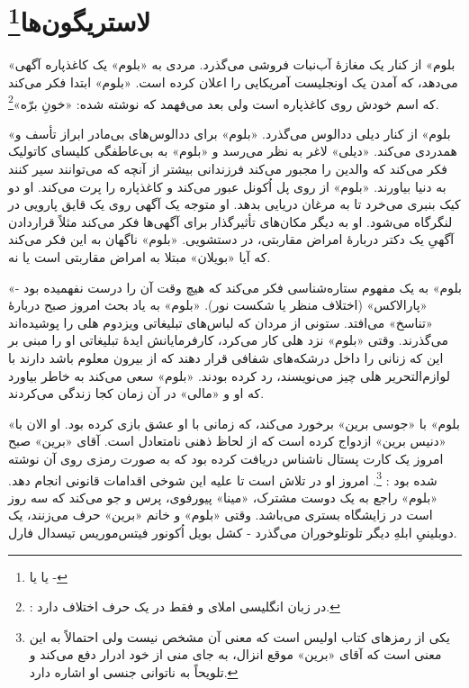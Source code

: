 \documentclass[12pt]{book}
\newcommand{\noun}[1]{«{#1}»}
\begin{document}
    \chapter[لاستریگون‌ها]{لاستریگون‌ها\protect\footnote{ یا  یا -}}\label{ep:8}
    \noun{بلوم} از کنار یک مغازۀ آب‌نبات فروشی می‌گذرد. مردی به \noun{بلوم} یک کاغذپاره آگهی می‌دهد، که آمدن یک اونجلیست آمریکایی را اعلان کرده است. \noun{بلوم} ابتدا فکر می‌کند که اسم خودش روی کاغذپاره است ولی بعد می‌فهمد که نوشته شده: «خونِ برّه»\footnote{: در زبان انگلیسی املای  و  فقط در یک حرف اختلاف دارد.}.

    \noun{بلوم} از کنار دیلی ددالوس می‌گذرد. \noun{بلوم} برای ددالوس‌های بی‌مادر ابراز تأسف و همدردی می‌کند. \noun{دیلی} لاغر به نظر می‌رسد و \noun{بلوم} به بی‌عاطفگی کلیسای کاتولیک فکر می‌کند که والدین را مجبور می‌کند فرزندانی بیشتر از آنچه که می‌توانند سیر کنند به دنیا بیاورند. \noun{بلوم} از روی پل اُکونل عبور می‌کند و کاغذپاره را پرت می‌کند. او دو کیک بنبری می‌خرد تا به مرغان دریایی بدهد. او متوجه یک آگهی روی یک قایق پارویی در لنگرگاه می‌شود. او به دیگر مکان‌های تأثیرگذار برای آگهی‌ها فکر می‌کند مثلاً قراردادن آگهیِ یک دکتر دربارۀ امراض مقاربتی، در دستشویی. \noun{بلوم} ناگهان به این فکر می‌کند که آیا \noun{بویلان} مبتلا به امراض مقاربتی است یا نه.

    \noun{بلوم} به یک مفهوم ستاره‌شناسی فکر می‌کند که هیچ وقت آن را درست نفهمیده بود - «پارالاکس» (اختلاف منظر یا شکست نور). \noun{بلوم} به یاد بحث امروز صبح دربارۀ «تناسخ» می‌افتد. ستونی از مردان که لباس‌های تبلیغاتی ویزدوم هلی را پوشیده‌اند می‌گذرند. وقتی \noun{بلوم} نزد هلی کار می‌کرد، کارفرمایانش ایدۀ تبلیغاتی او را مبنی بر این که زنانی را داخل درشکه‌های شفافی قرار دهند که از بیرون معلوم باشد دارند با لوازم‌التحریر هلی چیز می‌نویسند، رد کرده بودند. \noun{بلوم} سعی می‌کند به خاطر بیاورد که او و \noun{مالی} در آن زمان کجا زندگی می‌کردند.

    \noun{بلوم} با \noun{جوسی برین} برخورد می‌کند، که زمانی با او عشق بازی کرده بود. او الان با \noun{دنیس برین} ازدواج کرده است که از لحاظ ذهنی نامتعادل است. آقای \noun{برین} صبح امروز یک کارت پستال ناشناس دریافت کرده بود که به صورت رمزی روی آن نوشته شده بود : \footnote{ یکی از رمزهای کتاب اولیس است که معنی آن مشخص نیست ولی احتمالاً به این معنی است که آقای \noun{برین} موقع انزال، به جای منی از خود ادرار دفع می‌کند و تلویحاً به ناتوانی جنسی او اشاره دارد.}. امروز او در تلاش است تا علیه این شوخی اقدامات قانونی انجام دهد. \noun{بلوم} راجع به یک دوست مشترک، \noun{مینا} پیورفوی، پرس و جو می‌کند که سه روز است در زایشگاه بستری می‌باشد. وقتی \noun{بلوم} و خانم \noun{برین} حرف می‌زنند، یک دوبلینیِ ابلهِ دیگر تلوتلوخوران می‌گذرد - کشل بویل اُکونور فیتس‌موریس تیسدال فارل.
\end{document}
